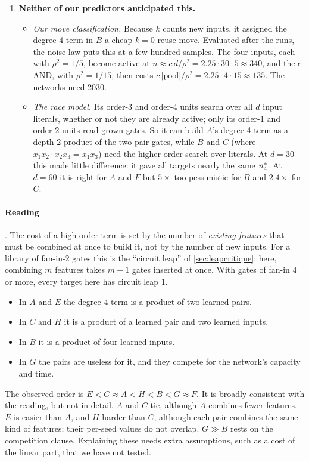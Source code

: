 \begin{enumerate}
\begin{itemize}
  \item \emph{$B$ in between.} $B$ grows like $d^{1.31}$. Its degree-4 term is helped by having found $x_1,\dots,x_4$, but still behaves partly like a higher-order search.
  \end{itemize}
\item \textbf{Neither of our predictors anticipated this.}
  \begin{itemize}
  \item \emph{Our move classification.} Because $k$ counts new inputs, it assigned the degree-4 term in $B$ a cheap $k=0$ reuse move. Evaluated after the runs, the noise law puts this at a few hundred samples. The four inputs, each with $\rho^2=1/5$, become active at $n\approx c\,d/\rho^2=2.25\cdot30\cdot5\approx340$, and their AND, with $\rho^2=1/15$, then costs $c\,|\text{pool}|/\rho^2=2.25\cdot4\cdot15\approx135$. The networks need 2030.
  \item \emph{The race model.} Its order-3 and order-4 units search over all $d$ input literals, whether or not they are already active; only its order-1 and order-2 units read grown gates. So it can build $A$'s degree-4 term as a depth-2 product of the two pair gates, while $B$ and $C$ (where $x_1x_2\cdot x_2x_3=x_1x_3$) need the higher-order search over literals. At $d=30$ this made little difference: it gave all targets nearly the same $n^{*}_4$. At $d=60$ it is right for $A$ and $F$ but $5\times$ too pessimistic for $B$ and $2.4\times$ for $C$.
  \end{itemize}
\end{enumerate}

\paragraph{Reading} . The cost of a high-order term is set by the number of \emph{existing features} that must be combined at once to build it, not by the number of new inputs. For a library of fan-in-2 gates this is the ``circuit leap'' of \cref{sec:leapcritique}: here, combining $m$ features takes $m-1$ gates inserted at once. With gates of fan-in 4 or more, every target here has circuit leap 1.
\begin{itemize}
\item In $A$ and $E$ the degree-4 term is a product of two learned pairs.
\item In $C$ and $H$ it is a product of a learned pair and two learned inputs.
\item In $B$ it is a product of four learned inputs.
\item In $G$ the pairs are useless for it, and they compete for the network's capacity and time.
\end{itemize}
The observed order is $E<C\approx A<H<B<G\approx F$. It is broadly consistent with the reading, but not in detail. $A$ and $C$ tie, although $A$ combines fewer features. $E$ is easier than $A$, and $H$ harder than $C$, although each pair combines the same kind of features; their per-seed values do not overlap. $G\gg B$ rests on the competition clause. Explaining these needs extra assumptions, such as a cost of the linear part, that we have not tested.

